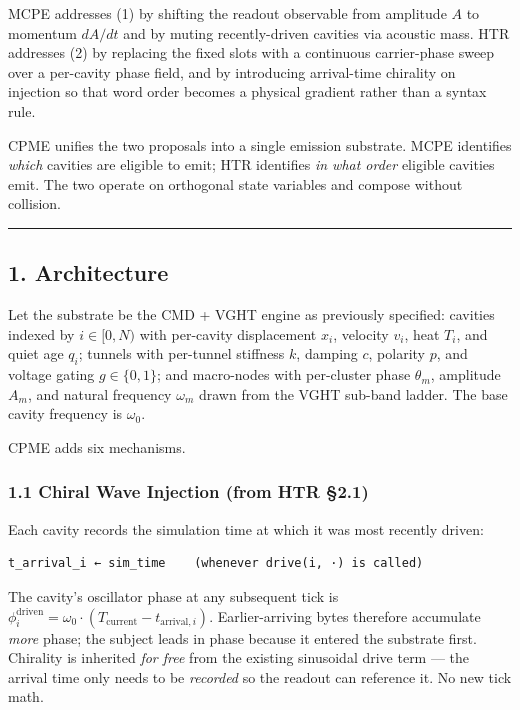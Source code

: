 \documentclass[
  11pt,
  a4paper,
]{article}
\begin{document}
MCPE addresses (1) by shifting the readout observable from amplitude
\(A\) to momentum \(dA/dt\) and by muting recently-driven cavities via
acoustic mass. HTR addresses (2) by replacing the fixed slots with a
continuous carrier-phase sweep over a per-cavity phase field, and by
introducing arrival-time chirality on injection so that word order
becomes a physical gradient rather than a syntax rule.

CPME unifies the two proposals into a single emission substrate. MCPE
identifies \emph{which} cavities are eligible to emit; HTR identifies
\emph{in what order} eligible cavities emit. The two operate on
orthogonal state variables and compose without collision.

\begin{center}\rule{0.5\linewidth}{0.5pt}\end{center}

\subsection{1. Architecture}\label{architecture}

Let the substrate be the CMD + VGHT engine as previously specified:
cavities indexed by \(i \in [0, N)\) with per-cavity displacement
\(x_i\), velocity \(v_i\), heat \(T_i\), and quiet age \(q_i\); tunnels
with per-tunnel stiffness \(k\), damping \(c\), polarity \(p\), and
voltage gating \(g \in \{0, 1\}\); and macro-nodes with per-cluster
phase \(\theta_m\), amplitude \(A_m\), and natural frequency
\(\omega_m\) drawn from the VGHT sub-band ladder. The base cavity
frequency is \(\omega_0\).

CPME adds six mechanisms.

\subsubsection{1.1 Chiral Wave Injection (from HTR
§2.1)}\label{chiral-wave-injection-from-htr-2.1}

Each cavity records the simulation time at which it was most recently
driven:

\begin{verbatim}
t_arrival_i ← sim_time    (whenever drive(i, ·) is called)
\end{verbatim}

The cavity's oscillator phase at any subsequent tick is
\(\phi_i^{\text{driven}} = \omega_0 \cdot (T_{\text{current}} - t_{\text{arrival}, i})\).
Earlier-arriving bytes therefore accumulate \emph{more} phase; the
subject leads in phase because it entered the substrate first. Chirality
is inherited \emph{for free} from the existing sinusoidal drive term ---
the arrival time only needs to be \emph{recorded} so the readout can
reference it. No new tick math.
\end{document}
